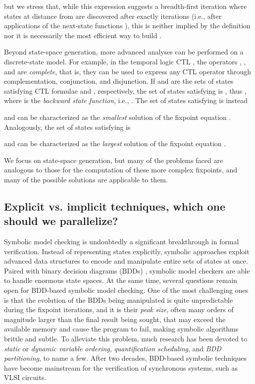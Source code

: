 \documentclass[copyright,creativecommons]{eptcs}
\begin{document}
but we stress that, while this expression suggests a breadth-first
iteration where states at distance  from  are discovered
after exactly  iterations
(i.e., after  applications of the next-state functions ), this is
neither implied by the definition nor it is necessarily the most efficient
way to build .


Beyond state-space generation, more advanced analyses
can be performed on a discrete-state model.
For example, in the temporal logic CTL
\cite{Clarke1981CTL,McMillan1993Book},
the operators , , and  are \emph{complete},
that is, they can be used to express any CTL operator
through complementation, conjunction, and disjunction.
If  and  are the sets of states satisfying CTL
formulae  and , respectively, the set of states satisfying  is
,
thus ,
where  is the \emph{backward state function}, i.e.,
.
The set of states satisfying  is instead

and can be characterized as the
\emph{smallest} solution of the fixpoint equation
.
Analogously, the set of states satisfying  is

and can be characterized as the \emph{largest}
solution of the fixpoint equation
.


We focus on state-space generation, but
many of the problems faced are analogous to those for the computation
of these more complex fixpoints, and many of the possible solutions
are applicable to them.


\subsection{Explicit vs. implicit techniques, which one should we parallelize?}

Symbolic model checking \cite{Burch1992} is undoubtedly a significant
breakthrough in formal verification.
Instead of representing states explicitly, symbolic approaches exploit advanced
data structures to encode and manipulate entire sets of states at once.
Paired with binary decision diagrams (BDDs) \cite{Bryant1986}, symbolic model
checkers are able to handle enormous state spaces.
At the same time, several questions remain open for BDD-based symbolic model
checking.
One of the most challenging ones is that the evolution of the BDDs being
manipulated is quite unpredictable during the fixpoint iterations, and it is
their \emph{peak size}, often many orders of
magnitude larger than the final result being sought,
that may exceed the available memory and cause the
program to fail, making symbolic algorithms brittle and subtle.
To alleviate this problem, much research has been devoted to \emph{static}
or \emph{dynamic variable ordering}, \emph{quantification scheduling},
and \emph{BDD partitioning}, to name a few.
After two decades, BDD-based symbolic techniques have become mainstream
for the verification of synchronous systems, such as VLSI circuits.
\end{document}

